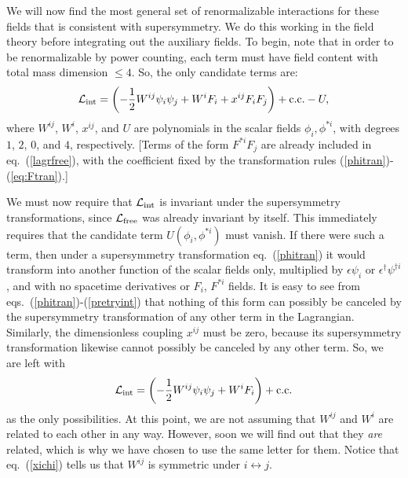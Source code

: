 \documentclass[12pt]{article}
\def\beq{\begin{eqnarray}}
\def\eeq{\end{eqnarray}}
\def\lagr{{\cal L}}
\def\conj{{{\rm c.c.}}}
\def\half{{1\over 2}}
\begin{document}
We will now find the most general set of renormalizable interactions for
these fields that is consistent with supersymmetry. We do this working in
the field theory before integrating out the auxiliary fields. To begin,
note that in order to be renormalizable by power counting, each term must
have field content with total mass dimension $\leq 4$. So, the only
candidate terms are: 
\beq
\lagr_{\rm int} =
\left (-{1\over 2} W^{ij} \psi_i \psi_j + W^i F_i + x^{ij} F_i F_j \right ) 
+ \conj  - U,
\label{pretryint}
\eeq
where $W^{ij}$, $W^i$, $x^{ij}$, and $U$ are polynomials in the scalar
fields $\phi_i, \phi^{*i}$, with degrees $1$, $2$, $0$, and $4$,
respectively. [Terms of the form $F^{*i} F_j$ are already included in 
eq.~(\ref{lagrfree}), with the coefficient fixed by the transformation 
rules (\ref{phitran})-(\ref{eq:Ftran}).]

We must now require that $\lagr_{\rm int}$ is invariant under the
supersymmetry transformations, since $\lagr_{\rm free}$ was already
invariant by itself.  This immediately requires that the candidate term
$U(\phi_i, \phi^{*i})$ must vanish. If there were such a term, then under
a supersymmetry transformation eq.~(\ref{phitran}) it would transform into
another function of the scalar fields only, multiplied by $\epsilon\psi_i$
or ${\epsilon^\dagger}{\psi}^{\dagger i}$, and with no spacetime
derivatives or $F_i$, $F^{*i}$ fields. It is easy to see from
eqs.~(\ref{phitran})-(\ref{pretryint}) that nothing of this form can possibly
be canceled by the supersymmetry transformation of any other term in the
Lagrangian. Similarly, the dimensionless coupling $x^{ij}$ must be zero,
because its supersymmetry transformation likewise cannot possibly be
canceled by any other term. So, we are left with
\beq
\lagr_{\rm int} =
\left (-\half W^{ij} \psi_i \psi_j + W^i F_i \right ) + \conj
\label{tryint}
\eeq
as the only possibilities. At this point, we are not assuming that $W^{ij}$
and $W^i$ are related to each other in any way. However, soon we will 
find out that they {\it are} related, which is why we have chosen to use
the same letter for them. Notice that eq.~(\ref{xichi}) tells us that
$W^{ij}$ is symmetric under $i\leftrightarrow j$. 
\end{document}

